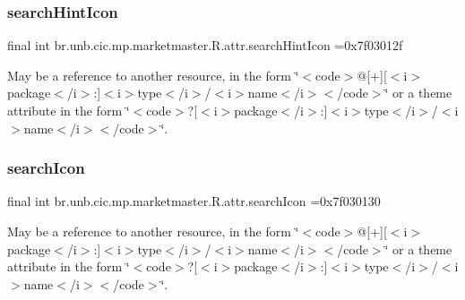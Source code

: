 \subsubsection{\texorpdfstring{search\+Hint\+Icon}{searchHintIcon}}
{\footnotesize\ttfamily final int br.\+unb.\+cic.\+mp.\+marketmaster.\+R.\+attr.\+search\+Hint\+Icon =0x7f03012f\hspace{0.3cm}{\ttfamily [static]}}

May be a reference to another resource, in the form \char`\"{}$<$code$>$@\mbox{[}+\mbox{]}\mbox{[}$<$i$>$package$<$/i$>$\+:\mbox{]}$<$i$>$type$<$/i$>$/$<$i$>$name$<$/i$>$$<$/code$>$\char`\"{} or a theme attribute in the form \char`\"{}$<$code$>$?\mbox{[}$<$i$>$package$<$/i$>$\+:\mbox{]}$<$i$>$type$<$/i$>$/$<$i$>$name$<$/i$>$$<$/code$>$\char`\"{}. \mbox{\label{classbr_1_1unb_1_1cic_1_1mp_1_1marketmaster_1_1R_1_1attr_aafb37d839baeada6d26920e282df1154}} 
\subsubsection{\texorpdfstring{search\+Icon}{searchIcon}}
{\footnotesize\ttfamily final int br.\+unb.\+cic.\+mp.\+marketmaster.\+R.\+attr.\+search\+Icon =0x7f030130\hspace{0.3cm}{\ttfamily [static]}}

May be a reference to another resource, in the form \char`\"{}$<$code$>$@\mbox{[}+\mbox{]}\mbox{[}$<$i$>$package$<$/i$>$\+:\mbox{]}$<$i$>$type$<$/i$>$/$<$i$>$name$<$/i$>$$<$/code$>$\char`\"{} or a theme attribute in the form \char`\"{}$<$code$>$?\mbox{[}$<$i$>$package$<$/i$>$\+:\mbox{]}$<$i$>$type$<$/i$>$/$<$i$>$name$<$/i$>$$<$/code$>$\char`\"{}. \mbox{\label{classbr_1_1unb_1_1cic_1_1mp_1_1marketmaster_1_1R_1_1attr_afbd3f1d596d4deccc33df2e0e71f5a81}} 
